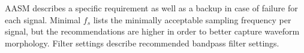 \begin{table}[tb]
\begin{threeparttable}
\begin{tabular}{@{}llll@{}}
                \end{tabular}
            \begin{tablenotes}
            \item  \acs{AASM} describes a specific requirement as well as a backup in case of failure for each signal. Minimal \( f_s \) lists the minimally acceptable sampling frequency per signal, but the recommendations are higher in order to better capture waveform morphology. Filter settings describe recommended bandpass filter settings.
            \end{tablenotes}
            \end{threeparttable}
            \end{table}
            
        
        
        
